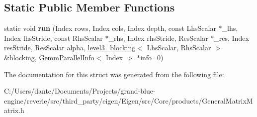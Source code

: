 \subsection*{Static Public Member Functions}
\begin{DoxyCompactItemize}
\item 
\mbox{\label{struct_eigen_1_1internal_1_1general__matrix__matrix__product_3_01_index_00_01_lhs_scalar_00_01_lc92e3fc5d91273c14187477f2d000bbe_a9b8f6ad1b46b12768084b3b7679f1893}} 
static void {\bfseries run} (Index rows, Index cols, Index depth, const Lhs\+Scalar $\ast$\+\_\+lhs, Index lhs\+Stride, const Rhs\+Scalar $\ast$\+\_\+rhs, Index rhs\+Stride, Res\+Scalar $\ast$\+\_\+res, Index res\+Stride, Res\+Scalar alpha, \mbox{\hyperlink{class_eigen_1_1internal_1_1level3__blocking}{level3\+\_\+blocking}}$<$ Lhs\+Scalar, Rhs\+Scalar $>$ \&blocking, \mbox{\hyperlink{struct_eigen_1_1internal_1_1_gemm_parallel_info}{Gemm\+Parallel\+Info}}$<$ Index $>$ $\ast$info=0)
\end{DoxyCompactItemize}


The documentation for this struct was generated from the following file\+:\begin{DoxyCompactItemize}
\item 
C\+:/\+Users/dante/\+Documents/\+Projects/grand-\/blue-\/engine/reverie/src/third\+\_\+party/eigen/\+Eigen/src/\+Core/products/General\+Matrix\+Matrix.\+h\end{DoxyCompactItemize}
